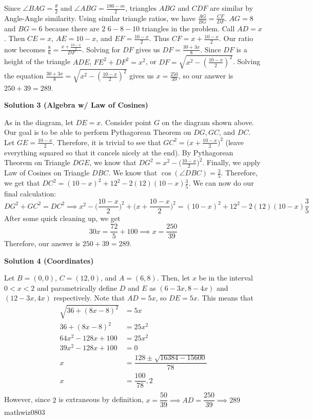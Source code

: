 \begin{enumerate}
 Since $\angle BAG = \frac{\theta}{2}$ and $\angle ABG = \frac{180-m}{2}$, triangles $ABG$ and $CDF$ are similar by Angle-Angle similarity. Using similar triangle ratios, we have $\frac{AG}{BG} = \frac{CF}{DF}$. $AG = 8$ and $BG = 6$ because there are $2$ $6-8-10$ triangles in the problem. Call $AD = x$. Then $CE = x$, $AE = 10-x$, and $EF = \frac{10-x}{2}$. Thus $CF = x + \frac{10-x}{2}$. Our ratio now becomes $\frac{8}{6} = \frac{x+ \frac{10-x}{2}}{DF}$. Solving for $DF$ gives us $DF = \frac{30+3x}{8}$. Since $DF$ is a height of the triangle $ADE$, $FE^2 + DF^2 = x^2$, or $DF = \sqrt{x^2 - (\frac{10-x}{2})^2}$. Solving the equation $\frac{30+3x}{8} = \sqrt{x^2 - (\frac{10-x}{2})^2}$ gives us $x = \frac{250}{39}$, so our answer is $250+39 = \boxed{289}$.

 



\textbf{Solution 3 (Algebra w/ Law of Cosines)}

As in the diagram, let $DE = x$. Consider point $G$ on the diagram shown above. Our goal is to be able to perform Pythagorean Theorem on $DG, GC$, and $DC$. Let $GE = \frac{10-x}{2}$. Therefore, it is trivial to see that $GC^2 = \Big(x + \frac{10-x}{2}\Big)^2$ (leave everything squared so that it cancels nicely at the end). By Pythagorean Theorem on Triangle $DGE$, we know that $DG^2 = x^2 - \Big(\frac{10-x}{2}\Big)^2$. Finally, we apply Law of Cosines on Triangle $DBC$. We know that $\cos(\angle DBC) = \frac{3}{5}$. Therefore, we get that $DC^2 = (10-x)^2 + 12^2 - 2(12)(10-x)\frac{3}{5}$. We can now do our final calculation:
 \[DG^2 + GC^2 = DC^2 \implies x^2 - \Big(\frac{10-x}{2}\Big)^2 + \Big(x + \frac{10-x}{2}\Big)^2 = (10-x)^2 + 12^2 - 2(12)(10-x)\frac{3}{5}\]After some quick cleaning up, we get
 \[30x = \frac{72}{5} + 100 \implies x = \frac{250}{39}\]Therefore, our answer is $250+39=\boxed{289}$.

 



\textbf{Solution 4 (Coordinates)}

Let $B = (0, 0)$, $C = (12, 0)$, and $A = (6, 8)$. Then, let $x$ be in the interval $0<x<2$ and parametrically define $D$ and $E$ as $(6-3x, 8-4x)$ and $(12-3x, 4x)$ respectively. Note that $AD = 5x$, so $DE = 5x$. This means that
 \begin{align*} \sqrt{36+(8x-8)^2} &= 5x\\ 36+(8x-8)^2 &= 25x^2\\ 64x^2-128x+100 &= 25x^2\\ 39x^2-128x+100 &= 0\\ x &= \dfrac{128\pm\sqrt{16384-15600}}{78}\\ x &= \dfrac{100}{78}, 2\\ \end{align*}
However, since $2$ is extraneous by definition, $x=\dfrac{50}{39}\implies AD = \dfrac{250}{39}\implies\boxed{289}$ ~ mathwiz0803


\end{enumerate}
